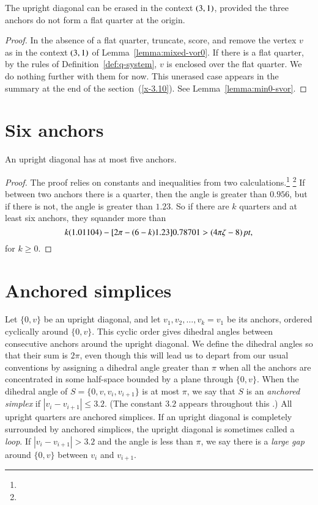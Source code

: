 \begin{lemma}
    \label{lemma:unerased}
The upright diagonal can be erased in the context $\relax(3,1)$, provided
the three anchors do not form a flat quarter at the origin.
\end{lemma}

\begin{proof}
In the absence of a flat quarter, truncate, score, and remove the
vertex $v$ as in the context $\relax(3,1)$ of
Lemma~\ref{lemma:mixed-vor0}. If there is a flat quarter, by the
rules of Definition~\ref{def:q-system}, $v$ is enclosed over the
flat quarter. We do nothing further with them for now. This
unerased case appears in the summary at the end of the
section~(\ref{x-3.10}).  See Lemma~\ref{lemma:min0-svor}.
\end{proof}

\section{Six anchors} %

\begin{lemma}  An upright diagonal has at most five anchors.
\end{lemma}

\begin{proof}
The proof relies on constants and inequalities from two
calculations.\footnote{} %
\footnote{} %
If between two anchors there is a quarter, then the angle is
greater than $0.956$, but if there is not,  the angle is greater than
$1.23$.  So if there are $k$ quarters and at least six anchors, they
squander more than
    $$ k (1.01104) - [2\pi-(6-k)1.23]0.78701 > (4\pi\zeta-8)\,\hbox{\it pt},$$
for $k\ge0$.
\end{proof}

\section{Anchored simplices} %
    \label{sec:anchored-simplex}

Let $\{0,v\}$ be an upright diagonal, and let
$v_1,v_2,\ldots,v_k=v_1$ be its anchors, ordered cyclically around
$\{0,v\}$.  This cyclic order gives dihedral angles between
consecutive anchors around the upright diagonal. We define the
dihedral angles so that their sum is $2\pi$, even though this will
lead us to depart from our usual conventions by assigning a
dihedral angle greater than $\pi$ when all the anchors are
concentrated in some half-space bounded by a plane through
$\{0,v\}$. When the dihedral angle of $S=\{0,v,v_i,v_{i+1}\}$ is at
most $\pi$, we say that $S$ is an {\it anchored simplex\/} if
$|v_i-v_{i+1}|\le3.2$. (The constant $3.2$ appears throughout this
\chap.) All upright quarters are anchored simplices. If an upright
diagonal is completely surrounded by anchored simplices, the
upright diagonal is sometimes called a {\it loop}. If
$|v_i-v_{i+1}|>3.2$ and the angle is less than $\pi$, we say there
is a {\it large gap\/} around $\{0,v\}$ between $v_i$ and $v_{i+1}$.

